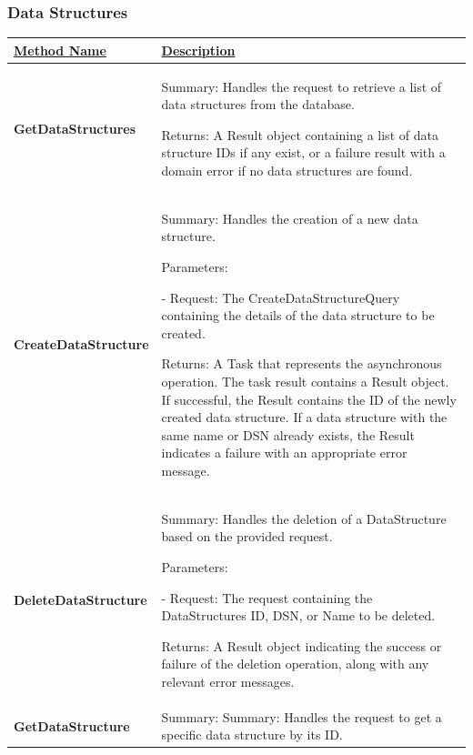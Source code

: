 \subsubsection{Data Structures}
\begin{longtable}
    \centering
    \renewcommand{\arraystretch}{1.2}
    \begin{tabular}{|p{0.25\linewidth}|p{0.75\linewidth}|}
\hline
    \underline{Method Name} & \underline{Description} 
\\
\hline \textbf{GetDataStructures} & Summary: Handles the request to retrieve a list of data structures from the database.

Returns: A Result object containing a list of data structure IDs if any exist, or a failure result with a domain error if no data structures are found.
\\       
\hline \textbf{CreateDataStructure} & Summary: Handles the creation of a new data structure.

Parameters:

- Request: The CreateDataStructureQuery containing the details of the data structure to be created.

Returns: A Task that represents the asynchronous operation. The task result contains a Result object. If successful, the Result contains the ID of the newly created data structure. If a data structure with the same name or DSN already exists, the Result indicates a failure with an appropriate error message.
\\     
\hline \textbf{DeleteDataStructure} & Summary: Handles the deletion of a DataStructure based on the provided request.

Parameters:

- Request: The request containing the DataStructures ID, DSN, or Name to be deleted.

Returns: A Result object indicating the success or failure of the deletion operation, along with any relevant error messages.
\\
\hline \textbf{GetDataStructure} & Summary: Summary: Handles the request to get a specific data structure by its ID.


\end{tabular}
\end{longtable}
